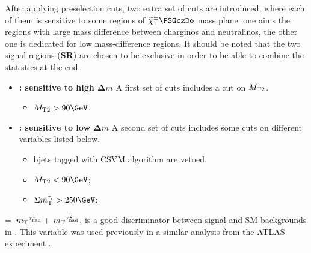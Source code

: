 After applying preselection cuts, two extra set of cuts are introduced, where each of them is sensitive to some regions of $\chione\PSGczDo$ mass plane: one aims the regions with large mass difference between charginos and neutralinos, the other one is dedicated for low mass-difference regions. It should be noted that the two signal regions ({\bf SR}) are chosen to be exclusive in order to be able to combine the statistics at the end.
\begin{itemize}
\item {\bf \binone: sensitive to high $\boldsymbol\Delta m$}
A first set of cuts includes a cut on ${M_{\rm T2}}$.
\begin{itemize}
\item $\mttwo>90\GeV$.
\end{itemize}
\item {\bf \bintwo: sensitive to low $\boldsymbol\Delta m$}
A second set of cuts includes some cuts on different variables listed below.
\begin{itemize}
\item bjets tagged with CSVM algorithm are vetoed.
\item $\mttwo<90\GeV$;
\item $\SumMT>250\GeV$;
\end{itemize}
\end{itemize}
\SumMT = $\,{m_{\rm T}}^{\tau_{\rm had}^1} + \,{m_{\rm T}}^{\tau_{\rm had}^2}$, is a good discriminator
between signal and SM backgrounds in \bintwo. 
This variable was used previously in a similar analysis from the ATLAS experiment \cite{Aad:2014yka}.

